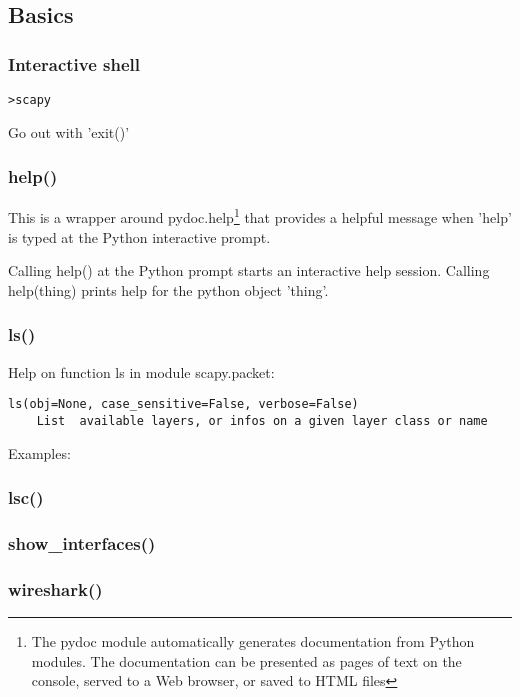 \documentclass[11pt,a4paper]{article}
\begin{document}
\subsection{Basics}
\subsubsection{Interactive shell}
\begin{lstlisting}
>scapy 
\end{lstlisting}

Go out with 'exit()'

\subsubsection{help()}
This is a wrapper around pydoc.help\footnote{The pydoc module automatically generates documentation from Python modules. The documentation can be presented as pages of text on the console, served to a Web browser, or saved to HTML files} that provides a helpful message when 'help' is typed at the Python interactive prompt.

Calling help() at the Python prompt starts an interactive help session.
Calling help(thing) prints help for the python object 'thing'.

\subsubsection{ls()}
Help on function ls in module scapy.packet:
\begin{lstlisting}
ls(obj=None, case_sensitive=False, verbose=False)
    List  available layers, or infos on a given layer class or name
\end{lstlisting}
Examples:


\subsubsection{lsc()}

\subsubsection{show\_interfaces()}

\subsubsection{wireshark()}
\end{document}

